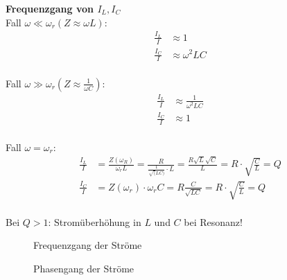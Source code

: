 \textbf{Frequenzgang von $I_L, I_C$}\\
Fall $\omega \ll \omega_r (Z \approx \omega L)$:\\
\begin{align}
	\frac{I_L}{I} &\approx 1\nonumber\\
	\frac{I_C}{I} &\approx \omega^2LC\nonumber
\end{align}\\
Fall $\omega \gg \omega_r (Z \approx \frac{1}{\omega C})$:\\
\begin{align}
	\frac{I_L}{I} &\approx \frac{1}{\omega^2LC}\nonumber\\
	\frac{I_C}{I} &\approx 1\nonumber
\end{align}\\
Fall $\omega = \omega_r$:\\
\begin{align}
	\frac{I_L}{I} &= \frac{Z(\omega_R)}{\omega_r L} =
	\frac{R}{\frac{1}{\sqrt(LC)}\cdot L} = \frac{R\sqrt{L}\sqrt{C}}{L} =
	R\cdot\sqrt{\frac{C}{L}} = Q\nonumber\\
	\frac{I_C}{I} &= Z(\omega_r)\cdot \omega_r C = R \frac{C}{\sqrt{LC}} = R\cdot
	\sqrt{\frac{C}{L}} = Q\nonumber
\end{align}\\

Bei $Q>1$: Stromüberhöhung in $L$ und $C$ bei Resonanz!

\begin{figure}[!h]
	\centering
	
	\caption{Frequenzgang der Ströme}
	\label{fig:ParallelStromBetrag}
\end{figure}
\begin{figure}[!h]
	\centering
	
	\caption{Phasengang der Ströme}
	\label{fig:ParallelStromPhase}
\end{figure}

